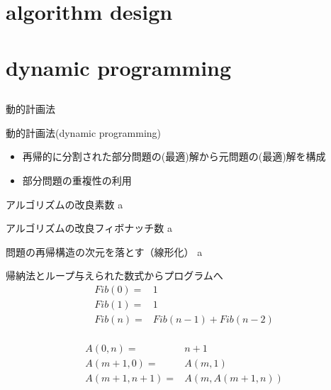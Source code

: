 \documentclass{beamer}
\subtitle{}
\begin{document}
\begin{frame}[fragile]{}
\titlepage
\end{frame}

\section{algorithm design}		%
\subsection{}

\section{dynamic programming}		%
\subsection{}

\begin{frame}[fragile]{動的計画法}{}

\begin{block}{動的計画法(dynamic programming)}
\begin{itemize}%
\item 再帰的に分割された部分問題の(最適)解から元問題の(最適)解を構成
\item 部分問題の重複性の利用
\end{itemize}
\end{block}

\end{frame}


\begin{frame}[fragile]{アルゴリズムの改良}{素数}
a
\end{frame}

\begin{frame}[fragile]{アルゴリズムの改良}{フィボナッチ数}
a
\end{frame}

\begin{frame}[fragile]{問題の再帰構造の次元を落とす（線形化）}{}
a
\end{frame}


\begin{frame}[fragile]{帰納法とループ}{与えられた数式からプログラムへ}
\begin{align*}
Fib(0) =& 1\\
Fib(1) =& 1\\
Fib(n) =& Fib(n - 1) + Fib(n - 2)\\
\end{align*}

\begin{align*}
A(0, n) =& n + 1\\
A(m + 1, 0) =& A(m, 1)\\
A(m + 1, n + 1) =& A(m, A(m + 1, n))
\end{align*}
\end{frame}
\end{document}
